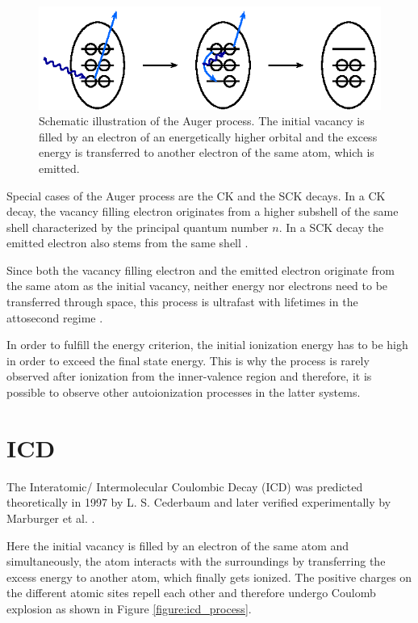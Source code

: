 \begin{figure}[h]
 \centering
 \includegraphics{pics/auger-pspic.eps}
 \caption{Schematic illustration of the Auger process. The initial vacancy is
          filled by an electron of an energetically higher orbital and the
          excess energy is transferred to another electron of the same atom,
          which is emitted.}
 \label{figure:auger_process}
\end{figure}

Special cases of the Auger process are the \ac{CK} and the \ac{SCK} decays.
In a \ac{CK} decay, the vacancy filling electron originates from a higher subshell
of the same shell characterized by the principal quantum number $n$. In a \ac{SCK}
decay the emitted electron also stems from the same shell \cite{Coster35}.

Since both the vacancy filling electron and the emitted electron originate
from the same atom as the initial vacancy, neither energy nor electrons need
to be transferred through space, this process is ultrafast with lifetimes
in the attosecond regime \cite{Ohno03}.

In order to fulfill the energy criterion, the initial ionization energy has to
be high in order to exceed the final state energy. This is why
the process is rarely observed after
ionization from the inner-valence region and therefore, it is possible to
observe other autoionization processes in the latter systems.

\section{\acl{ICD}}
The Interatomic/ Intermolecular Coulombic Decay (ICD) was predicted
theoretically in 1997 by L. S. Cederbaum \cite{Cederbaum97}
and later verified experimentally by Marburger et al. \cite{Marburger03}.

Here the initial vacancy is filled by an electron of the same atom and simultaneously,
the atom interacts with the surroundings by
transferring the excess energy to another atom, which finally gets ionized. The
positive charges on the different atomic sites repell each other and therefore undergo
Coulomb explosion as shown in Figure \ref{figure:icd_process}.


